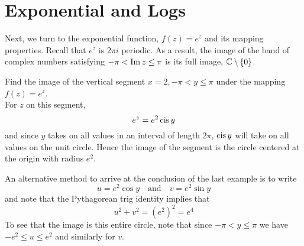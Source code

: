\documentclass[handout]{ximera}
\begin{document}
\section{Exponential and Logs}
Next, we turn to the exponential function, $f(z) = e^z$ and its mapping properties.
Recall that $e^z$ is $2\pi i$ periodic.  As a result, the image of the band of complex numbers satisfying
\(-\pi < \operatorname{Im} z \leq \pi\) is its full image, $\mathbb C \setminus \{0\}$.

\begin{example}[example 6]
Find the image of the vertical segment $x = 2, -\pi < y \leq \pi$ under the mapping $f(z) = e^z$.\\
For $z$ on this segment, 
\[
e^z = e^2 \operatorname{cis} y
\]
and since $y$ takes on all values in an interval of length $2\pi$, $\operatorname{cis} y$ will take on all values on the unit circle.
Hence the image of the segment is the circle centered at the origin with radius $e^2$.
\begin{image}
\end{image}
An alternative method to arrive at the conclusion of the last example is to write
\[
u = e^2\cos  y \quad \mbox{and} \quad v = e^2 \sin y
\]
and note that the Pythagorean trig identity implies that
\[
u^2 + v^2 = (e^2)^2 = e^4
\]
To see that the image is this entire circle, note that since $-\pi < y \leq \pi$ we have
$-e^2 \leq u \leq e^2$ and similarly for $v$.
\end{example}
\end{document}
